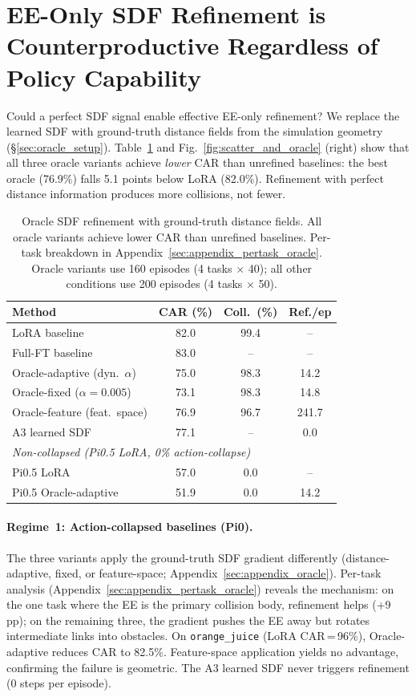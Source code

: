 \section{EE-Only SDF Refinement is Counterproductive Regardless of Policy Capability}\label{sec:ee_only}

Could a perfect SDF signal enable effective EE-only refinement? We replace the learned SDF with ground-truth distance fields from the simulation geometry (\S\ref{sec:oracle_setup}). Table~\ref{tab:oracle} and Fig.~\ref{fig:scatter_and_oracle} (right) show that all three oracle variants achieve \emph{lower} CAR than unrefined baselines: the best oracle (76.9\%) falls 5.1 points below LoRA (82.0\%). Refinement with perfect distance information produces more collisions, not fewer.

\begin{table}[t]
\centering
\caption{Oracle SDF refinement with ground-truth distance fields. All oracle variants achieve lower CAR than unrefined baselines. Per-task breakdown in Appendix~\ref{sec:appendix_pertask_oracle}. Oracle variants use 160 episodes (4 tasks $\times$ 40); all other conditions use 200 episodes (4 tasks $\times$ 50).}
\label{tab:oracle}
\vspace{2pt}
\footnotesize
\begin{tabular}{lccc}
\toprule
Method & CAR (\%) & Coll.\ (\%) & Ref./ep \\
\midrule
LoRA baseline & 82.0 & 99.4 & -- \\
Full-FT baseline & 83.0 & -- & -- \\
\midrule
Oracle-adaptive (dyn.\ $\alpha$) & 75.0 & 98.3 & 14.2 \\
Oracle-fixed ($\alpha{=}0.005$) & 73.1 & 98.3 & 14.8 \\
Oracle-feature (feat.\ space) & 76.9 & 96.7 & 241.7 \\
\midrule
A3 learned SDF & 77.1 & -- & 0.0 \\
\midrule
\multicolumn{4}{l}{\textit{Non-collapsed (Pi0.5 LoRA, 0\% action-collapse)}} \\
Pi0.5 LoRA & 57.0 & 0.0 & -- \\
Pi0.5 Oracle-adaptive & 51.9 & 0.0 & 14.2 \\
\bottomrule
\end{tabular}
\end{table}

\paragraph{Regime~1: Action-collapsed baselines (Pi0).}
The three variants apply the ground-truth SDF gradient differently (distance-adaptive, fixed, or feature-space; Appendix~\ref{sec:appendix_oracle}). Per-task analysis (Appendix~\ref{sec:appendix_pertask_oracle}) reveals the mechanism: on the one task where the EE is the primary collision body, refinement helps (+9\,pp); on the remaining three, the gradient pushes the EE away but rotates intermediate links into obstacles. On \texttt{orange\_juice} (LoRA CAR\,=\,96\%), Oracle-adaptive reduces CAR to 82.5\%. Feature-space application yields no advantage, confirming the failure is geometric. The A3 learned SDF never triggers refinement (0 steps per episode).

